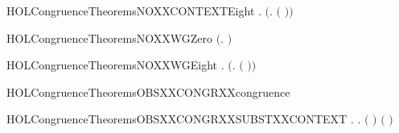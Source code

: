\newcommand{\HOLCongruenceTheoremsISXXCONSTXXalt}{\UseVerbatim{HOLCongruenceTheoremsISXXCONSTXXalt}}
\begin{SaveVerbatim}{HOLCongruenceTheoremsNOXXCONTEXTEight}
\HOLTokenTurnstile{} \HOLSymConst{\HOLTokenForall{}} . \HOLSymConst{\HOLTokenNeg{}}  \HOLSymConst{\HOLTokenImp{}} \HOLSymConst{\HOLTokenNeg{}} \ensuremath{(}\HOLTokenLambda{}.   \ensuremath{(} \ensuremath{)}\ensuremath{)}
\end{SaveVerbatim}
\newcommand{\HOLCongruenceTheoremsNOXXCONTEXTEight}{\UseVerbatim{HOLCongruenceTheoremsNOXXCONTEXTEight}}
\begin{SaveVerbatim}{HOLCongruenceTheoremsNOXXWGZero}
\HOLTokenTurnstile{} \HOLSymConst{\HOLTokenNeg{}} \ensuremath{(}\HOLTokenLambda{}. \ensuremath{)}
\end{SaveVerbatim}
\newcommand{\HOLCongruenceTheoremsNOXXWGZero}{\UseVerbatim{HOLCongruenceTheoremsNOXXWGZero}}
\begin{SaveVerbatim}{HOLCongruenceTheoremsNOXXWGEight}
\HOLTokenTurnstile{} \HOLSymConst{\HOLTokenForall{}} . \HOLSymConst{\HOLTokenNeg{}}  \HOLSymConst{\HOLTokenImp{}} \HOLSymConst{\HOLTokenNeg{}} \ensuremath{(}\HOLTokenLambda{}.   \ensuremath{(} \ensuremath{)}\ensuremath{)}
\end{SaveVerbatim}
\newcommand{\HOLCongruenceTheoremsNOXXWGEight}{\UseVerbatim{HOLCongruenceTheoremsNOXXWGEight}}
\begin{SaveVerbatim}{HOLCongruenceTheoremsOBSXXCONGRXXcongruence}
\HOLTokenTurnstile{}  
\end{SaveVerbatim}
\newcommand{\HOLCongruenceTheoremsOBSXXCONGRXXcongruence}{\UseVerbatim{HOLCongruenceTheoremsOBSXXCONGRXXcongruence}}
\begin{SaveVerbatim}{HOLCongruenceTheoremsOBSXXCONGRXXSUBSTXXCONTEXT}
\HOLTokenTurnstile{} \HOLSymConst{\HOLTokenForall{}} .    \HOLSymConst{\HOLTokenImp{}} \HOLSymConst{\HOLTokenForall{}}.   \HOLSymConst{\HOLTokenImp{}}  \ensuremath{(} \ensuremath{)} \ensuremath{(} \ensuremath{)}
\end{SaveVerbatim}
